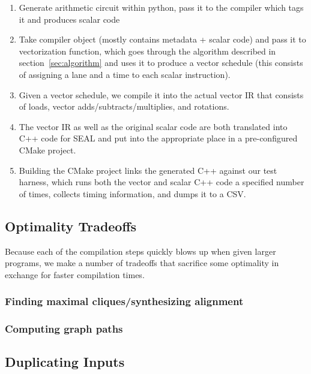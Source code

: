 \begin{enumerate}
    \item Generate arithmetic circuit within python, pass it to the compiler which tags it and produces scalar code
    \item Take compiler object (mostly contains metadata + scalar code) and pass it to vectorization function, which goes through the algorithm described in section~\ref{sec:algorithm} and uses it to produce a vector schedule (this consists of assigning a lane and a time to each scalar instruction).
    \item Given a vector schedule, we compile it into the actual vector IR that consists of loads, vector adds/subtracts/multiplies, and rotations.
    \item The vector IR as well as the original scalar code are both translated into C++ code for SEAL and put into the appropriate place in a pre-configured CMake project.
    \item Building the CMake project links the generated C++ against our test harness, which runs both the vector and scalar C++ code a specified number of times, collects timing information, and dumps it to a CSV.
\end{enumerate}

\subsection{Optimality Tradeoffs}
Because each of the compilation steps quickly blows up when given larger programs, we make a number of tradeoffs that sacrifice some optimality in exchange for faster compilation times.
\subsubsection*{Finding maximal cliques/synthesizing alignment}
\subsubsection*{Computing graph paths}

\subsection{Duplicating Inputs}